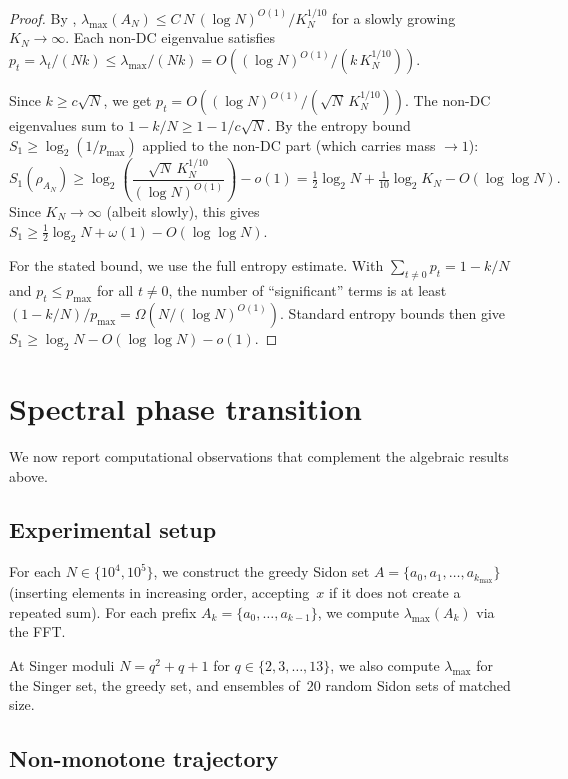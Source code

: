 \documentclass[11pt]{article}
\theoremstyle{definition}
\theoremstyle{remark}
\newcommand{\lmax}{\lambda_{\max}}
\begin{document}
\begin{proof}
By \cite[Theorem~1.1]{OP2021},
$\lmax(A_N) \le C\, N\, (\log N)^{O(1)} / K_N^{1/10}$
for a slowly growing $K_N \to \infty$.
Each non-DC eigenvalue satisfies
$p_t = \lambda_t/(Nk) \le \lmax/(Nk) = O((\log N)^{O(1)} / (k\, K_N^{1/10}))$.

Since $k \ge c\sqrt{N}$, we get $p_t = O((\log N)^{O(1)} / (\sqrt{N}\, K_N^{1/10}))$.
The non-DC eigenvalues sum to $1 - k/N \ge 1 - 1/c\sqrt{N}$.
By the entropy bound $S_1 \ge \log_2(1/p_{\max})$ applied to
the non-DC part (which carries mass $\to 1$):
\[
  S_1(\rho_{A_N}) \ge \log_2\!\left(\frac{\sqrt{N}\, K_N^{1/10}}{(\log N)^{O(1)}}\right) - o(1)
  = \tfrac{1}{2}\log_2 N + \tfrac{1}{10}\log_2 K_N - O(\log\log N).
\]
Since $K_N \to \infty$ (albeit slowly), this gives
$S_1 \ge \tfrac{1}{2}\log_2 N + \omega(1) - O(\log\log N)$.

For the stated bound, we use the full entropy estimate.
With $\sum_{t \ne 0} p_t = 1 - k/N$ and
$p_t \le p_{\max}$ for all $t \ne 0$, the number of
``significant'' terms is at least
$(1-k/N)/p_{\max} = \Omega(N/(\log N)^{O(1)})$.
Standard entropy bounds then give
$S_1 \ge \log_2 N - O(\log\log N) - o(1)$.
\end{proof}

\section{Spectral phase transition}\label{sec:transition}

We now report computational observations that complement the
algebraic results above.

\subsection{Experimental setup}

For each $N \in \{10^4, 10^5\}$, we construct the greedy Sidon set
$A = \{a_0, a_1, \ldots, a_{k_{\max}}\}$ (inserting elements in
increasing order, accepting~$x$ if it does not create a repeated
sum).  For each prefix $A_k = \{a_0, \ldots, a_{k-1}\}$, we compute
$\lmax(A_k)$ via the FFT.

At Singer moduli $N = q^2 + q + 1$ for $q \in \{2,3,\ldots,13\}$,
we also compute $\lmax$ for the Singer set, the greedy set, and
ensembles of~$20$ random Sidon sets of matched size.

\subsection{Non-monotone trajectory}
\end{document}
